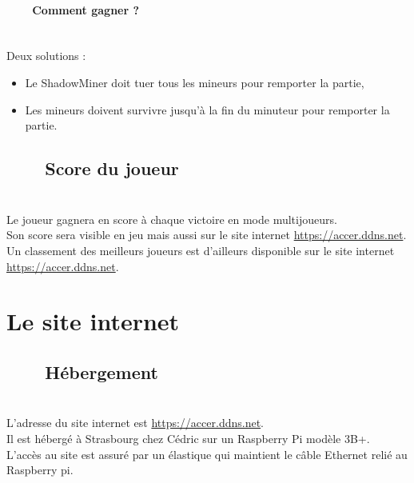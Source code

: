 \documentclass[titlepage, 13px, a4paper]{report}
\begin{document}
\paragraph*{~~~~Comment gagner ?} \hspace{0pt} \\
Deux solutions : \\
{\begin{itemize}
	\item Le ShadowMiner doit tuer tous les mineurs pour remporter la partie,
	\item Les mineurs doivent survivre jusqu’à la fin du minuteur pour remporter la partie. \\
\end{itemize}}

\subsection[Score du joueur]{~~~~Score du joueur}
\paragraph*{} \hspace{0pt} \\
Le joueur gagnera en score à chaque victoire en mode multijoueurs. \\
Son score sera visible en jeu mais aussi sur le site internet \url{https://accer.ddns.net}. \\
Un classement des meilleurs joueurs est d’ailleurs disponible sur le site internet \url{https://accer.ddns.net}. \\


\newpage

\section{Le site internet}
\subsection[Hébergement]{~~~~Hébergement}
\paragraph*{} \hspace{0pt} \\
L'adresse du site internet est \url{https://accer.ddns.net}. \\
Il est hébergé à Strasbourg chez Cédric sur un Raspberry Pi modèle 3B+. \\
L’accès au site est assuré par un élastique qui maintient le câble Ethernet relié au Raspberry pi. \\
\end{document}
